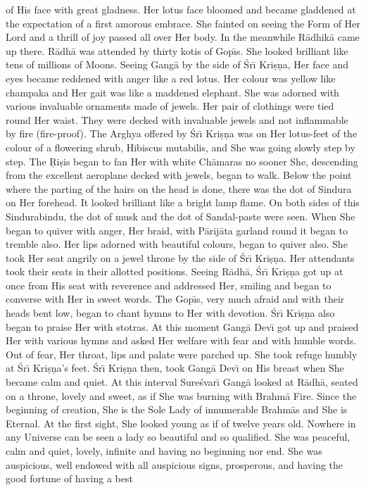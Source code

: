 of His face with great gladness. Her lotus face bloomed and became gladdened at the expectation of a first amorous embrace. She fainted on seeing the Form of Her Lord and a thrill of joy passed all over Her body. In the meanwhile R\=adhik\=a came up there. R\=adh\=a was attended by thirty kotis of Gop\={\i}s. She looked brilliant like tens of millions of Moons. Seeing Gang\=a by the side of \'Sr\={\i} Kri\d{s}\d{n}a, Her face and eyes became reddened with anger like a red lotus. Her colour was yellow like champaka and Her gait was like a maddened elephant. She was adorned with various invaluable ornaments made of jewels. Her pair of clothings were tied round Her waist. They were decked with invaluable jewels and not inflammable by fire (fire-proof). The Arghya offered by \'Sr\={\i} Kri\d{s}\d{n}a was on Her lotus-feet of the colour of a flowering shrub, Hibiscus mutabilis, and She was going slowly step by step. The \d{R}i\d{s}is began to fan Her with white Ch\=amaras no sooner She, descending from the excellent aeroplane decked with jewels, began to walk. Below the point where the parting of the hairs on the head is done, there was the dot of Sindura on Her forehead. It looked brilliant like a bright lamp flame. On both sides of this Sindurabindu, the dot of musk and the dot of Sandal-paste were seen. When She began to quiver with anger, Her braid, with P\=arij\=ata garland round it began to tremble also. Her lips adorned with beautiful colours, began to quiver also. She took Her seat angrily on a jewel throne by the side of \'Sr\={\i} Kri\d{s}\d{n}a. Her attendants took their seats in their allotted positions. Seeing R\=adh\=a, \'Sr\={\i} Kri\d{s}\d{n}a got up at once from His seat with reverence and addressed Her, smiling and began to converse with Her in sweet words. The Gop\={\i}s, very much afraid and with their heads bent low, began to chant hymns to Her with devotion. \'Sr\={\i} Kri\d{s}\d{n}a also began to praise Her with stotras. At this moment Gang\=a Dev\={\i} got up and praised Her with various hymns and asked Her welfare with fear and with humble words. Out of fear, Her throat, lips and palate were parched up. She took refuge humbly at \'Sr\={\i} Kri\d{s}\d{n}a's feet. \'Sr\={\i} Kri\d{s}\d{n}a then, took Gang\=a Dev\={\i} on His breast when She became calm and quiet. At this interval Sure\'svar\={\i} Gang\=a looked at R\=adh\=a, seated on a throne, lovely and sweet, as if She was burning with Brahm\=a Fire. Since the beginning of creation, She is the Sole Lady of innumerable Brahm\=as and She is Eternal. At the first sight, She looked young as if of twelve years old. Nowhere in any Universe can be seen a lady so beautiful and so qualified. She was peaceful, calm and quiet, lovely, infinite and having no beginning nor end. She was auspicious, well endowed with all auspicious signs, prosperous, and having the good fortune of having a best

